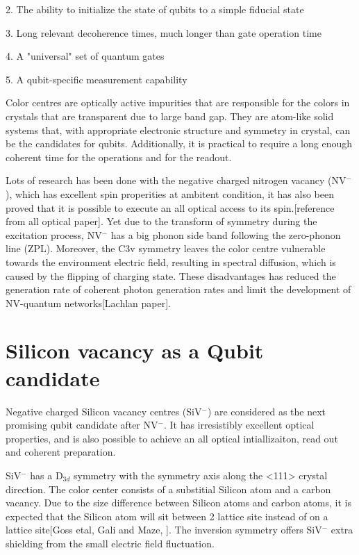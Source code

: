 2. The ability to initialize the state of qubits to a simple fiducial state

3. Long relevant decoherence times, much longer than gate operation time

4. A "universal" set of quantum gates

5. A qubit-specific measurement capability

Color centres are optically active impurities that are responsible for the colors in crystals that are transparent due to large band gap. They are atom-like solid systems that, with appropriate electronic structure and symmetry in crystal, can be the candidates for qubits. Additionally, it is practical to require a long enough coherent time for the operations and for the readout.  

Lots of research has been done with the negative charged nitrogen vacancy (NV$^{-}$), which has excellent spin properities at ambitent condition, it has also been proved that it is possible to execute an all optical access to its spin.[reference from all optical paper]. Yet due to the transform of symmetry during the excitation process, NV$^{-}$ has a big phonon side band following the zero-phonon line (ZPL). Moreover, the C3v symmetry leaves the color centre vulnerable towards the environment electric field, resulting in spectral diffusion, which is caused by the flipping of charging state. These disadvantages has reduced the generation rate of coherent photon generation rates and limit the development of NV-quantum networks[Lachlan paper].

\section[Silicon vacancy as a Qubit candidate]{Silicon vacancy as a Qubit candidate}

Negative charged Silicon vacancy centres (SiV$^{-}$) are considered as the next promising qubit candidate after NV$^{-}$. It has irresistibly excellent optical properties, and is also possible to achieve an all optical intiallizaiton, read out and coherent preparation.

SiV$^{-}$ has a D$_{3d}$ symmetry with the symmetry axis along the <111> crystal direction. The color center consists of a substitial Silicon atom and a carbon vacancy. Due to the size difference between Silicon atoms and carbon atoms, it is expected that the Silicon atom will sit between 2 lattice site instead of on a lattice site[Goss etal,  Gali and Maze, ]. The inversion symmetry offers SiV$^{-}$ extra shielding from the small electric field fluctuation.

